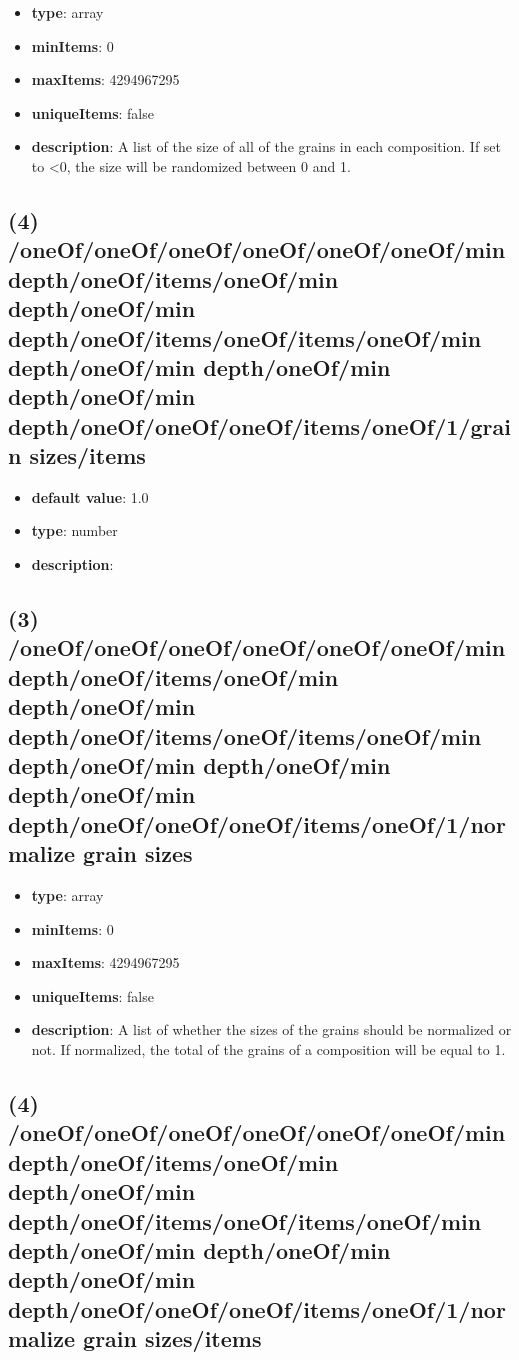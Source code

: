 \begin{itemize}[leftmargin=3em]\item {\bf type}: array
\item {\bf minItems}: 0
\item {\bf maxItems}: 4294967295
\item {\bf uniqueItems}: false
\item {\bf description}: A list of the size of all of the grains in each composition. If set to <0, the size will be randomized between 0 and 1.
\end{itemize}\subsection{(4) /oneOf/oneOf/oneOf/oneOf/oneOf/oneOf/min depth/oneOf/items/oneOf/min depth/oneOf/min depth/oneOf/items/oneOf/items/oneOf/min depth/oneOf/min depth/oneOf/min depth/oneOf/min depth/oneOf/oneOf/oneOf/items/oneOf/1/grain sizes/items}
\begin{itemize}[leftmargin=4em]\item {\bf default value}: 1.0
\item {\bf type}: number
\item {\bf description}: 
\end{itemize}\subsection{(3) /oneOf/oneOf/oneOf/oneOf/oneOf/oneOf/min depth/oneOf/items/oneOf/min depth/oneOf/min depth/oneOf/items/oneOf/items/oneOf/min depth/oneOf/min depth/oneOf/min depth/oneOf/min depth/oneOf/oneOf/oneOf/items/oneOf/1/normalize grain sizes}
\begin{itemize}[leftmargin=3em]\item {\bf type}: array
\item {\bf minItems}: 0
\item {\bf maxItems}: 4294967295
\item {\bf uniqueItems}: false
\item {\bf description}: A list of whether the sizes of the grains should be normalized or not. If normalized, the total of the grains of a composition will be equal to 1.
\end{itemize}\subsection{(4) /oneOf/oneOf/oneOf/oneOf/oneOf/oneOf/min depth/oneOf/items/oneOf/min depth/oneOf/min depth/oneOf/items/oneOf/items/oneOf/min depth/oneOf/min depth/oneOf/min depth/oneOf/min depth/oneOf/oneOf/oneOf/items/oneOf/1/normalize grain sizes/items}
